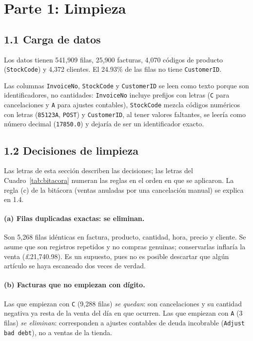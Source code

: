 \documentclass[11pt]{article}
\begin{document}
\section*{Parte 1: Limpieza}

\subsection*{1.1 Carga de datos}

Los datos tienen 541{,}909 filas, 25{,}900 facturas, 4{,}070 c\'odigos de
producto (\texttt{StockCode}) y 4{,}372 clientes. El 24.93\% de las filas no
tiene \texttt{CustomerID}.

Las columnas \texttt{InvoiceNo}, \texttt{StockCode} y \texttt{CustomerID} se
leen como texto porque son identificadores, no cantidades: \texttt{InvoiceNo}
incluye prefijos con letras (\texttt{C} para cancelaciones y \texttt{A} para
ajustes contables), \texttt{StockCode} mezcla c\'odigos num\'ericos con letras
(\texttt{85123A}, \texttt{POST}) y \texttt{CustomerID}, al tener valores
faltantes, se leer\'ia como n\'umero decimal (\texttt{17850.0}) y dejar\'ia de
ser un identificador exacto.

\subsection*{1.2 Decisiones de limpieza}

Las letras de esta secci\'on describen las decisiones; las letras del
Cuadro~\ref{tab:bitacora} numeran las reglas en el orden en que se aplicaron.
La regla (c) de la bit\'acora (ventas anuladas por una cancelaci\'on manual) se
explica en 1.4.

\paragraph{(a) Filas duplicadas exactas: se eliminan.} Son 5{,}268 filas
id\'enticas en factura, producto, cantidad, hora, precio y cliente. Se asume que
son registros repetidos y no compras genuinas; conservarlas inflar\'ia la venta
(\pounds 21{,}740.98). Es un supuesto, pues no es posible descartar que alg\'un
art\'iculo se haya escaneado dos veces de verdad.

\paragraph{(b) Facturas que no empiezan con d\'igito.} Las que empiezan con
\texttt{C} (9{,}288 filas) \emph{se quedan}: son cancelaciones y su cantidad
negativa ya resta de la venta del d\'ia en que ocurren. Las que empiezan con
\texttt{A} (3 filas) \emph{se eliminan}: corresponden a ajustes contables de
deuda incobrable (\texttt{Adjust bad debt}), no a ventas de la tienda.
\end{document}
